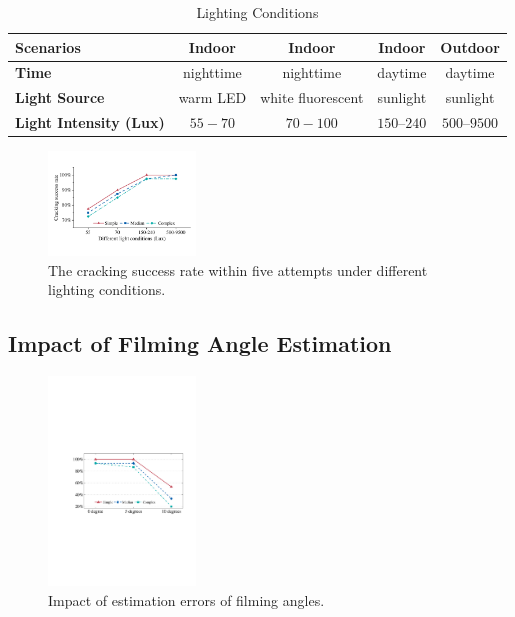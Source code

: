             \begin{table}[!t]
            \centering
            \caption{Lighting Conditions}
            \label{tab:light}
            \scriptsize
            \begin{tabular}{lcccc}
                \toprule
                \textbf{Scenarios} & Indoor  & Indoor & Indoor  & Outdoor\\
                \midrule
                \textbf{Time} & nighttime &  nighttime & daytime & daytime \\
                \textbf{Light Source}& warm LED & white fluorescent & sunlight &  sunlight \\
                \textbf{Light Intensity (Lux)} & $55-70$ & $70-100$ & $150$--$240$ & $500$--$9500$ \\
                \bottomrule
            \end{tabular}
            \vspace{-2mm}
        \end{table}


       \begin{figure}[t!]
            \centering
            \includegraphics[width=0.35\textwidth]{fig/light.pdf}
            \vspace{-2mm}
            \caption{The cracking success rate within five attempts under different lighting conditions.}
            \label{fig:light}
        \end{figure}



    \subsection{Impact of Filming Angle Estimation \label{sec:angle}}
    \begin{figure}[!t]
        \centering
        \includegraphics[width=0.35\textwidth]{fig/15.pdf}
        \vspace{-2mm}
        \caption{Impact of estimation errors of filming angles.}
        \vspace{-2mm}
        \label{fig:fig15}
    \end{figure}


